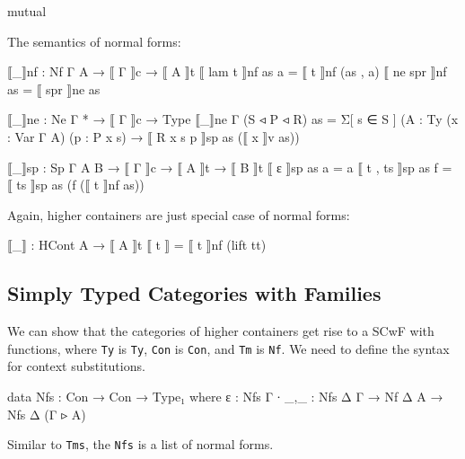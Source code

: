 \begin{code}[hide]
mutual
\end{code}

The semantics of normal forms:

\begin{code}
  ⟦_⟧nf : Nf Γ A → ⟦ Γ ⟧c → ⟦ A ⟧t
  ⟦ lam t ⟧nf as a = ⟦ t ⟧nf (as , a)
  ⟦ ne spr ⟧nf as = ⟦ spr ⟧ne as

  ⟦_⟧ne : Ne Γ * → ⟦ Γ ⟧c → Type
  ⟦_⟧ne {Γ} (S ◃ P ◃ R) as =
    Σ[ s ∈ S ] ({A : Ty} (x : Var Γ A) (p : P x s)
      → ⟦ R x s p ⟧sp as (⟦ x ⟧v as))

  ⟦_⟧sp : Sp Γ A B → ⟦ Γ ⟧c → ⟦ A ⟧t → ⟦ B ⟧t
  ⟦ ε ⟧sp as a = a
  ⟦ t , ts ⟧sp as f = ⟦ ts ⟧sp as (f (⟦ t ⟧nf as))
\end{code}

Again, higher containers are just special case of normal forms:

\begin{code}
⟦_⟧ : HCont A → ⟦ A ⟧t
⟦ t ⟧ = ⟦ t ⟧nf (lift tt)
\end{code}





\subsection{Simply Typed Categories with Families}

We can show that the categories of higher containers get rise to a SCwF with functions, where \texttt{Ty} is \texttt{Ty}, \texttt{Con} is \texttt{Con}, and \texttt{Tm} is \texttt{Nf}. We need to define the syntax for context substitutions.

\begin{code}
data Nfs : Con → Con → Type₁ where
  ε   : Nfs Γ ∙
  _,_ : Nfs Δ Γ → Nf Δ A → Nfs Δ (Γ ▹ A)
\end{code}

Similar to \texttt{Tms}, the \texttt{Nfs} is a list of normal forms.